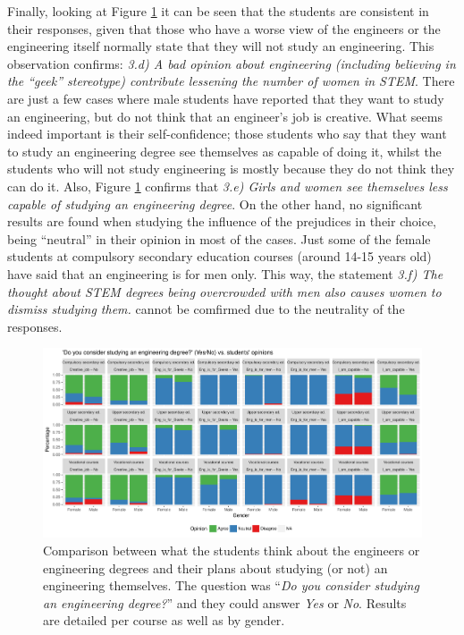 \documentclass[journal,transmag]{IEEEtran}
\begin{document}
Finally, looking at Figure \ref{fig:futurevsopinion} it can be seen that the students are consistent in their responses, given that those who have a worse view of the engineers or the engineering itself normally state that they will not study an engineering. This observation  confirms: \textit{3.d) A bad opinion about engineering (including believing in the ``geek'' stereotype) contribute lessening the number of women in STEM}. There are just a few cases where male students have reported that they want to study an engineering, but do not think that an engineer's job is creative. What seems indeed important is their self-confidence; those students who say that they want to study an engineering degree see themselves as capable of doing it, whilst the students who will not study engineering is mostly because they do not think they can do it. Also, Figure \ref{fig:futurevsopinion} confirms that \textit{3.e) Girls and women see themselves less capable of studying an engineering degree}. On the other hand, no significant results are found when studying the influence of the prejudices in their choice, being ``neutral'' in their opinion in most of the cases. Just some of the female students at compulsory secondary education courses (around 14-15 years old) have said that an engineering is for men only. This way, the statement \textit{3.f) The thought about STEM degrees being overcrowded with men also causes women to dismiss studying them.} cannot be comfirmed due to the neutrality of the responses.

\begin{figure}
	\centering
	\includegraphics[width=1\textwidth]{img/future_vs_opinion.pdf}
	\caption{Comparison between what the students think about the engineers or engineering degrees and their plans about studying (or not) an engineering themselves. The question was ``\textit{Do you consider studying an engineering degree?}'' and they could answer \textit{Yes} or \textit{No}. Results are detailed per course as well as by gender.}
	\label{fig:futurevsopinion}
\end{figure}
\end{document}

